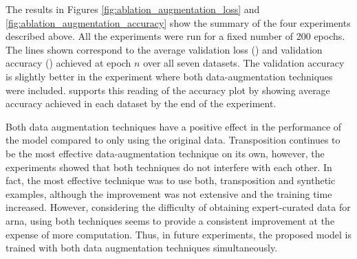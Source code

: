 
The results in Figures \ref{fig:ablation_augmentation_loss}
and \ref{fig:ablation_augmentation_accuracy} show the
summary of the four experiments described above. All the
experiments were run for a fixed number of 200 epochs. The
lines shown correspond to the average validation loss
() and validation
accuracy () achieved
at epoch $n$ over all seven datasets. The validation
accuracy is slightly better in the experiment where both
data-augmentation techniques were included.
 supports this reading of the
accuracy plot by showing average accuracy achieved in each
dataset by the end of the experiment.




Both data augmentation techniques have a positive effect in
the performance of the model compared to only using the
original data. Transposition continues to be the most
effective data-augmentation technique on its own, however,
the experiments showed that both techniques do not interfere
with each other. In fact, the most effective technique was
to use both, transposition and synthetic examples, although
the improvement was not extensive and the training time
increased. However, considering the difficulty of obtaining
expert-curated data for \gls{arna}, using both techniques
seems to provide a consistent improvement at the expense of
more computation. Thus, in future experiments, the proposed
model is trained with both data augmentation techniques
simultaneously.
